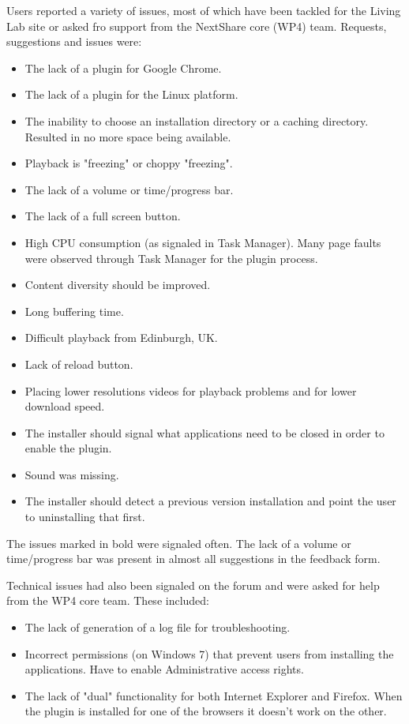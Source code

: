 Users reported a variety of issues, most of which have been tackled for the
Living Lab site or asked fro support from the NextShare core (WP4) team.
Requests, suggestions and issues were:
\begin{itemize}
  \item The lack of a plugin for Google Chrome.
  \item The lack of a plugin for the Linux platform.
  \item The inability to choose an installation directory or a caching
  directory. Resulted in no more space being available.
  \item Playback is "freezing" or choppy "freezing".
  \item The lack of a volume or time/progress bar.
  \item The lack of a full screen button.
  \item High CPU consumption (as signaled in Task Manager). Many page faults
  were observed through Task Manager for the plugin process.
  \item Content diversity should be improved.
  \item Long buffering time.
  \item Difficult playback from Edinburgh, UK.
  \item Lack of reload button.
  \item Placing lower resolutions videos for playback problems and for lower
  download speed.
  \item The installer should signal what applications need to be closed in
  order to enable the plugin.
  \item Sound was missing.
  \item The installer should detect a previous version installation and point
  the user to uninstalling that first.
\end{itemize}

The issues marked in bold were signaled often. The lack of a volume or
time/progress bar was present in almost all suggestions in the feedback form.

Technical issues had also been signaled on the forum and were asked for help
from the WP4 core team. These included:
\begin{itemize}
  \item The lack of generation of a log file for troubleshooting.
  \item Incorrect permissions (on Windows 7) that prevent users from
  installing the applications. Have to enable Administrative access rights.
  \item The lack of "dual" functionality for both Internet Explorer and
  Firefox. When the plugin is installed for one of the browsers it doesn't
  work on the other.
\end{itemize}

